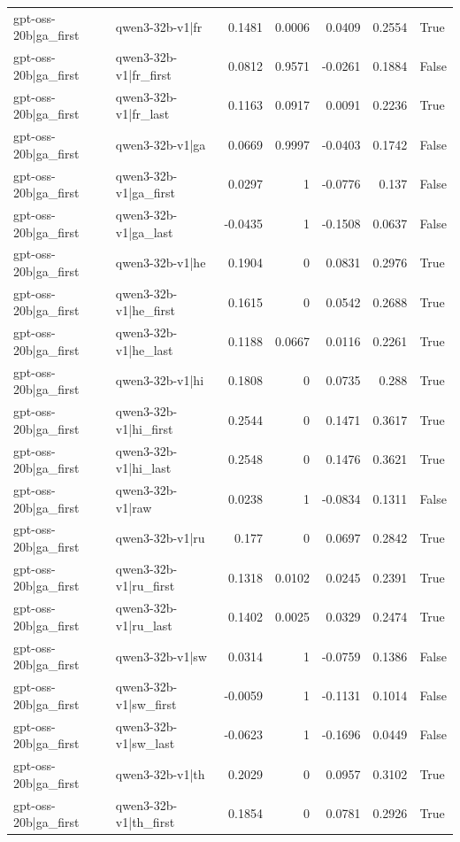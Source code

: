 \begin{table}
\begin{tabular}{l l r r r r l}
gpt-oss-20b|ga_first & qwen3-32b-v1|fr & 0.1481 & 0.0006 & 0.0409 & 0.2554 & True \\
gpt-oss-20b|ga_first & qwen3-32b-v1|fr_first & 0.0812 & 0.9571 & -0.0261 & 0.1884 & False \\
gpt-oss-20b|ga_first & qwen3-32b-v1|fr_last & 0.1163 & 0.0917 & 0.0091 & 0.2236 & True \\
gpt-oss-20b|ga_first & qwen3-32b-v1|ga & 0.0669 & 0.9997 & -0.0403 & 0.1742 & False \\
gpt-oss-20b|ga_first & qwen3-32b-v1|ga_first & 0.0297 & 1 & -0.0776 & 0.137 & False \\
gpt-oss-20b|ga_first & qwen3-32b-v1|ga_last & -0.0435 & 1 & -0.1508 & 0.0637 & False \\
gpt-oss-20b|ga_first & qwen3-32b-v1|he & 0.1904 & 0 & 0.0831 & 0.2976 & True \\
gpt-oss-20b|ga_first & qwen3-32b-v1|he_first & 0.1615 & 0 & 0.0542 & 0.2688 & True \\
gpt-oss-20b|ga_first & qwen3-32b-v1|he_last & 0.1188 & 0.0667 & 0.0116 & 0.2261 & True \\
gpt-oss-20b|ga_first & qwen3-32b-v1|hi & 0.1808 & 0 & 0.0735 & 0.288 & True \\
gpt-oss-20b|ga_first & qwen3-32b-v1|hi_first & 0.2544 & 0 & 0.1471 & 0.3617 & True \\
gpt-oss-20b|ga_first & qwen3-32b-v1|hi_last & 0.2548 & 0 & 0.1476 & 0.3621 & True \\
gpt-oss-20b|ga_first & qwen3-32b-v1|raw & 0.0238 & 1 & -0.0834 & 0.1311 & False \\
gpt-oss-20b|ga_first & qwen3-32b-v1|ru & 0.177 & 0 & 0.0697 & 0.2842 & True \\
gpt-oss-20b|ga_first & qwen3-32b-v1|ru_first & 0.1318 & 0.0102 & 0.0245 & 0.2391 & True \\
gpt-oss-20b|ga_first & qwen3-32b-v1|ru_last & 0.1402 & 0.0025 & 0.0329 & 0.2474 & True \\
gpt-oss-20b|ga_first & qwen3-32b-v1|sw & 0.0314 & 1 & -0.0759 & 0.1386 & False \\
gpt-oss-20b|ga_first & qwen3-32b-v1|sw_first & -0.0059 & 1 & -0.1131 & 0.1014 & False \\
gpt-oss-20b|ga_first & qwen3-32b-v1|sw_last & -0.0623 & 1 & -0.1696 & 0.0449 & False \\
gpt-oss-20b|ga_first & qwen3-32b-v1|th & 0.2029 & 0 & 0.0957 & 0.3102 & True \\
gpt-oss-20b|ga_first & qwen3-32b-v1|th_first & 0.1854 & 0 & 0.0781 & 0.2926 & True \\

\end{tabular}
\end{table}
